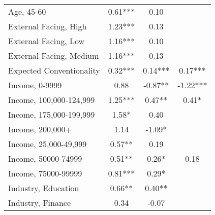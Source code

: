 {\begin{center}
{\begin{longtable}{l*{3}{c}}
            Age, 45-60                         & 0.61***                     & 0.10                        &                             \\
            External Facing, High              & 1.23***                     & 0.13                        &                             \\
            External Facing, Low               & 1.16***                     & 0.10                        &                             \\
            External Facing, Medium            & 1.16***                     & 0.13                        &                             \\
            Expected Conventionality           & 0.32***                     & 0.14***                     & 0.17***                     \\
            Income, 0-9999                     & 0.88                        & -0.87**                     & -1.22***                    \\
            Income, 100,000-124,999            & 1.25***                     & 0.47**                      & 0.41*                       \\
            Income, 175,000-199,999            & 1.58*                       & 0.40                        &                             \\
            Income, 200,000+                   & 1.14                        & -1.09*                      &                             \\
            Income, 25,000-49,999              & 0.57**                      & 0.19                        &                             \\
            Income, 50000-74999                & 0.51**                      & 0.26*                       & 0.18                        \\
            Income, 75000-99999                & 0.81***                     & 0.29*                       &                             \\
            Industry, Education                & 0.66**                      & 0.40**                      &                             \\
            Industry, Finance                  & 0.34                        & -0.07                       &                             \\

\end{longtable}}
\end{center}}
